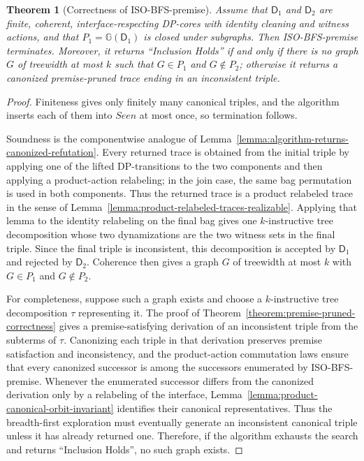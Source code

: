 \documentclass[11pt,a4paper]{article}
\newtheorem{theorem}{Theorem}
\newcommand{\treewidthvalue}{k}
\newcommand{\abstractdecomposition}{\tau}
\newcommand{\dpcoregraphproperty}[1]{\mathbb{G}(#1)}
\newcommand{\dpcore}{\mathsf{D}}
\begin{document}
\begin{theorem}[Correctness of ISO-BFS-premise]
\label{theorem:iso-bfs-premise-correctness}
Assume that $\dpcore_1$ and $\dpcore_2$ are finite, coherent, interface-respecting DP-cores with identity cleaning and witness actions, and that $P_1=\dpcoregraphproperty{\dpcore_1}$ is closed under subgraphs. Then ISO-BFS-premise terminates. Moreover, it returns ``Inclusion Holds'' if and only if there is no graph $G$ of treewidth at most $\treewidthvalue$ such that $G\in P_1$ and $G\notin P_2$; otherwise it returns a canonized premise-pruned trace ending in an inconsistent triple.
\end{theorem}
\begin{proof}
Finiteness gives only finitely many canonical triples, and the algorithm inserts each of them into $Seen$ at most once, so termination follows.

Soundness is the componentwise analogue of Lemma~\ref{lemma:algorithm-returns-canonized-refutation}. Every returned trace is obtained from the initial triple by applying one of the lifted DP-transitions to the two components and then applying a product-action relabeling; in the join case, the same bag permutation is used in both components. Thus the returned trace is a product relabeled trace in the sense of Lemma~\ref{lemma:product-relabeled-traces-realizable}. Applying that lemma to the identity relabeling on the final bag gives one $\treewidthvalue$-instructive tree decomposition whose two dynamizations are the two witness sets in the final triple. Since the final triple is inconsistent, this decomposition is accepted by $\dpcore_1$ and rejected by $\dpcore_2$. Coherence then gives a graph $G$ of treewidth at most $\treewidthvalue$ with $G\in P_1$ and $G\notin P_2$.

For completeness, suppose such a graph exists and choose a $\treewidthvalue$-instructive tree decomposition $\abstractdecomposition$ representing it. The proof of Theorem~\ref{theorem:premise-pruned-correctness} gives a premise-satisfying derivation of an inconsistent triple from the subterms of $\abstractdecomposition$. Canonizing each triple in that derivation preserves premise satisfaction and inconsistency, and the product-action commutation laws ensure that every canonized successor is among the successors enumerated by ISO-BFS-premise. Whenever the enumerated successor differs from the canonized derivation only by a relabeling of the interface, Lemma~\ref{lemma:product-canonical-orbit-invariant} identifies their canonical representatives. Thus the breadth-first exploration must eventually generate an inconsistent canonical triple unless it has already returned one. Therefore, if the algorithm exhausts the search and returns ``Inclusion Holds'', no such graph exists.
\end{proof}
\end{document}
